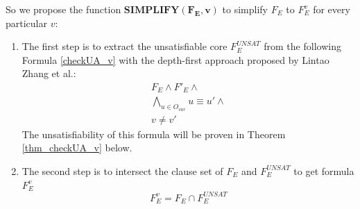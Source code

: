 \documentclass[journal]{IEEEtran}
\begin{document}
So we propose the function $\boldsymbol{SIMPLIFY(F_E,v)}$ to simplify $F_E$ to $F_E^v$ for every particular $v$:
\begin{enumerate}
\item The first step is to
extract the unsatisfiable core $F_E^{UNSAT}$ from the following Formula \ref{checkUA_v} with the depth-first approach proposed by Lintao Zhang et al.\cite{VALIDSAT}:
\begin{equation}\label{checkUA_v}
\begin{array}{c}
F_E\wedge F'_E\wedge \\
\bigwedge_{u\in O_{var}} u\equiv u'\wedge \\
v\ne v'
\end{array}
\end{equation}
The unsatisfiability of this formula will be proven in Theorem \ref{thm_checkUA_v} below.
\item The second step is to
intersect the clause set of $F_E$ and $F_E^{UNSAT}$ to get formula $F_E^v$
\begin{equation}\label{checkUA_fev}
F_E^v=F_E\cap F_E^{UNSAT}
\end{equation}
\end{enumerate}
\end{document}
